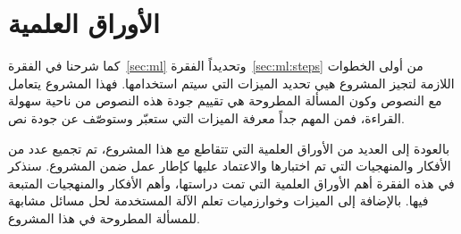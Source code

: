 \section{الأوراق العلمية}
كما شرحنا في الفقرة~\ref{sec:ml} وتحديداً الفقرة~\ref{sec:ml:steps} من أولى الخطوات اللازمة لتجيز المشروع هيي تحديد الميزات التي سيتم استخدامها.
فهذا المشروع يتعامل مع النصوص وكون المسألة المطروحة هي تقييم جودة هذه النصوص من ناحية سهولة القراءة،
فمن المهم جداً معرفة الميزات التي ستعبّر وستوصّف عن جودة نص.

بالعودة إلى العديد من الأوراق العلمية التي تتقاطع مع هذا المشروع،
تم تجميع عدد من الأفكار والمنهجيات التي تم اختبارها والاعتماد عليها كإطار عمل ضمن المشروع.
سنذكر في هذه الفقرة أهم الأوراق العلمية التي تمت دراستها،
وأهم الأفكار والمنهجيات المتبعة فيها.
بالإضافة إلى الميزات وخوارزميات تعلم الآلة المستخدمة لحل مسائل مشابهة للمسألة المطروحة في هذا المشروع.





